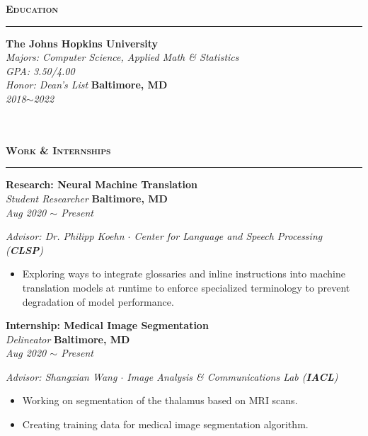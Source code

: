 \documentclass[10pt, letterpaper]{article}
\begin{document}
{\large \textbf{\textsc{Education}}}
\vspace{5pt}
\hrule
{}
\begin{paracol}{2}
	\textbf{The Johns Hopkins University}\\
	\textit{Majors: Computer Science, Applied Math \& Statistics}\\
	\textit{GPA: 3.50/4.00}\\
	\textit{Honor: Dean's List}
	\switchcolumn
	\raggedleft\textbf{Baltimore, MD}\\
	\raggedleft\textit{2018$\sim$2022}\\~\\~\\
\end{paracol}
\vspace{3mm}

{\large \textbf{\textsc{Work \& Internships}}}
\vspace{5pt}
\hrule

\begin{paracol}{2}
	\textbf{Research: Neural Machine Translation}\\
	\textit{Student Researcher}
	\switchcolumn
	\raggedleft\textbf{Baltimore, MD}\\
	\raggedleft\textit{Aug 2020 $\sim$ Present}
\end{paracol}\vspace{-1mm}
\textit{Advisor: Dr. Philipp Koehn $\cdot$ Center for Language and Speech Processing (\textbf{CLSP})}
\vspace{-2mm}
\begin{itemize}
	\item Exploring ways to integrate glossaries and inline instructions into machine translation models at runtime to enforce specialized terminology to prevent degradation of model performance. 
	 
\end{itemize}
\vspace{-2mm} 

\begin{paracol}{2}
	\textbf{Internship: Medical Image Segmentation}\\
	\textit{Delineator}
	\switchcolumn
	\raggedleft\textbf{Baltimore, MD}\\
	\raggedleft\textit{Aug 2020 $\sim$ Present}
\end{paracol}\vspace{-1mm}
\textit{Advisor: Shangxian Wang $\cdot$ Image Analysis \& Communications Lab (\textbf{IACL})}
\vspace{-2mm}
\begin{itemize}
	\item Working on segmentation of the thalamus based on MRI scans.\vspace{-3mm}
	\item Creating training data for medical image segmentation algorithm.
\end{itemize}
\vspace{-2mm} 
\end{document}
